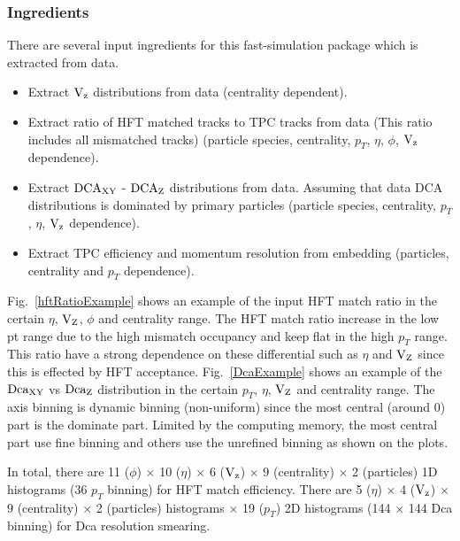 \subsubsection{Ingredients}
\label{ingredients}
There are several input ingredients for this fast-simulation package which is extracted from data.
\begin{itemize}
\item Extract $\textup{V}_\textup{z}$ distributions from data (centrality dependent).
\item Extract ratio of HFT matched tracks to TPC tracks from data (This ratio includes all mismatched tracks) (particle species, centrality, $p_T$, $\eta$, $\phi$, $\textup{V}_\textup{z}$ dependence).
\item Extract $\textup{DCA}_{\textup{XY}}$ - $\textup{DCA}_{\textup{Z}}$ distributions from data. Assuming that data DCA distributions is dominated by primary particles (particle species, centrality, $p_T$, $\eta$, $\textup{V}_\textup{z}$ dependence).
\item Extract TPC efficiency and momentum resolution from embedding (particles, centrality and $p_T$ dependence).
\end{itemize}

Fig.~\ref{hftRatioExample} shows an example of the input HFT match ratio in the certain $\eta$, $\textup{V}_\textup{Z}$, $\phi$ and centrality range. The HFT match ratio increase in the low pt range due to the high mismatch occupancy and keep flat in the high $p_T$ range. This ratio have a strong dependence on these differential such as $\eta$ and $\textup{V}_\textup{Z}$ since this is effected by HFT acceptance. Fig.~\ref{DcaExample} shows an example of the $\textup{Dca}_{\textup{XY}}$ vs $\textup{Dca}_{\textup{Z}}$ distribution in the certain $p_T$, $\eta$, $\textup{V}_\textup{Z}$ and centrality range. The axis binning is dynamic binning (non-uniform) since the most central (around 0) part is the dominate part. Limited by the computing memory, the most central part use fine binning and others use the unrefined binning as shown on the plots.

In total, there are 11 ($\phi$) $\times$ 10 ($\eta$) $\times$ 6 ($\textup{V}_\textup{z}$) $\times$ 9 (centrality) $\times$ 2 (particles) 1D histograms (36 $p_T$ binning) for HFT match efficiency.
There are 5 ($\eta$) $\times$ 4 ($\textup{V}_\textup{z}$) $\times$ 9 (centrality) $\times$ 2 (particles) histograms $\times$ 19 ($p_T$) 2D histograms (144 $\times$ 144 Dca binning) for Dca resolution smearing.

